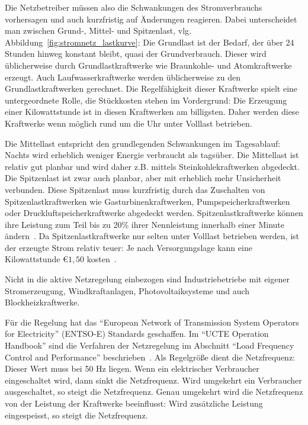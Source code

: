 \documentclass[12pt,BCOR=8.5mm]{scrartcl}
\begin{document}
\begin{enumerate}
    Die Netzbetreiber müssen also die Schwankungen des Stromverbrauchs
    vorhersagen und auch kurzfristig auf Änderungen reagieren. Dabei
    unterscheidet man zwischen Grund-, Mittel- und Spitzenlast, vlg.
    Abbildung~\ref{fig:stromnetz_lastkurve}: Die
    Grundlast ist der Bedarf, der über 24 Stunden hinweg konstant
    bleibt, quasi der Grundverbrauch. Dieser wird üblicherweise durch
    Grundlastkraftwerke wie Braunkohle- und Atomkraftwerke erzeugt. Auch
    Laufwasserkraftwerke werden üblicherweise zu den
    Grundlastkraftwerken gerechnet. Die Regelfähigkeit dieser Kraftwerke
    spielt eine untergeordnete Rolle, die Stückkosten stehen im
    Vordergrund: Die Erzeugung einer Kilowattstunde ist in diesen
    Kraftwerken am billigsten. Daher werden diese Kraftwerke wenn
    möglich rund um die Uhr unter Volllast betrieben.

    Die Mittellast entspricht den grundlegenden Schwankungen im
    Tagesablauf: Nachts wird erheblich weniger Energie verbraucht als
    tagsüber. Die Mittellast ist relativ gut planbar und
    wird daher z.B. mittels Steinkohlekraftwerken abgedeckt. Die
    Spitzenlast ist zwar auch planbar, aber mit erheblich mehr
    Unsicherheit verbunden. Diese Spitzenlast muss kurzfristig durch das
    Zuschalten von Spitzenlastkraftwerken wie Gasturbinenkraftwerken,
    Pumpspeicherkraftwerken oder Druckluftspeicherkraftwerke abgedeckt
    werden. Spitzenlastkraftwerke können ihre Leistung zum Teil bis zu
    20\% ihrer Nennleistung innerhalb einer Minute
    ändern~\cite{wikipedia10spitzenlast}. Da Spitzenlastkraftwerke
    nur selten unter Volllast betrieben werden, ist der erzeugte Strom
    relativ teuer: Je nach Versorgungslage kann eine Kilowattstunde
    $\euro 1,50$ kosten~\cite{wikipedia10regelleistung}. 

    Nicht in die aktive Netzregelung einbezogen sind Industriebetriebe
    mit eigener Stromerzeugung, Windkraftanlagen, Photovoltaiksysteme
    und auch Blockheizkraftwerke. 

    Für die Regelung hat das "`European Network of Transmission System
    Operators for Electricity"' (ENTSO-E) Standards geschaffen. Im
    "`UCTE Operation Handbook"' sind die Verfahren der Netzregelung im
    Abschnitt "`Load Frequency Control and Performance"'
    beschrieben~\cite{entsoe10ucte}. Als Regelgröße dient die
    Netzfrequenz: Dieser Wert muss bei 50 Hz liegen. Wenn ein
    elektrischer Verbraucher eingeschaltet wird, dann sinkt die
    Netzfrequenz. Wird umgekehrt ein Verbraucher ausgeschaltet, so
    steigt die Netzfrequenz. Genau umgekehrt wird die Netzfrequenz von
    der Leistung der Kraftwerke beeinflusst: Wird zusätzliche Leistung
    eingespeisst, so steigt die Netzfrequenz.


\end{enumerate}
\end{document}
